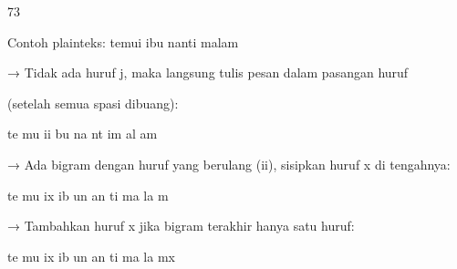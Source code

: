 \documentclass{article}
\begin{document}

73

Contoh  plainteks:  temui ibu nanti malam 

   → Tidak ada huruf j, maka langsung tulis  pesan dalam pasangan huruf

        (setelah semua spasi dibuang):


te mu ii bu na nt im al am 


 → Ada bigram dengan huruf yang berulang (ii), sisipkan huruf x di tengahnya:  


te mu ix ib un an ti ma la m  


  → Tambahkan huruf x jika bigram terakhir hanya satu huruf:


te mu ix ib un an ti ma la mx
\end{document}
